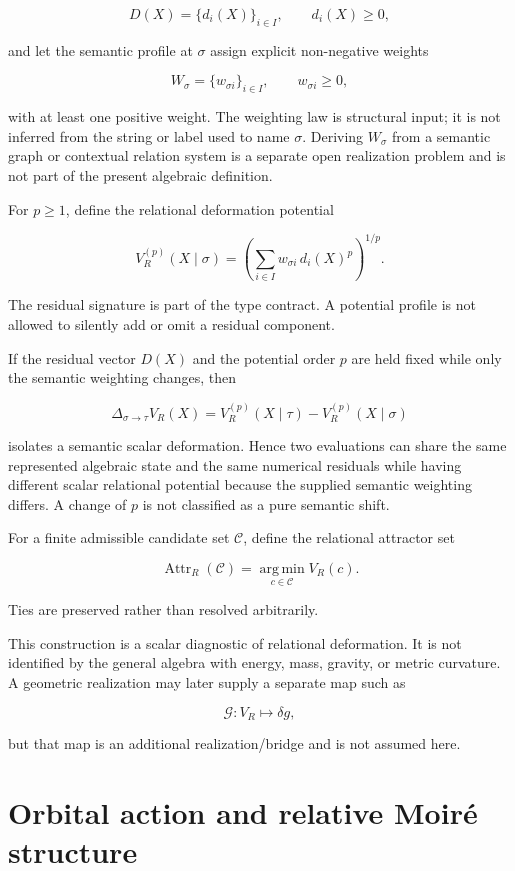 \documentclass[11pt]{article}
\begin{document}
\[
D(X)=\{d_i(X)\}_{i\in I},
\qquad
d_i(X)\ge 0,
\]

and let the semantic profile at \(\sigma\) assign explicit non-negative
weights

\[
W_\sigma=\{w_{\sigma i}\}_{i\in I},
\qquad
w_{\sigma i}\ge0,
\]

with at least one positive weight. The weighting law is structural input; it
is not inferred from the string or label used to name \(\sigma\). Deriving
\(W_\sigma\) from a semantic graph or contextual relation system is a
separate open realization problem and is not part of the present algebraic
definition.

For \(p\ge1\), define the relational deformation potential

\[
\boxed{
V_R^{(p)}(X\mid\sigma)
=
\left(
\sum_{i\in I}
w_{\sigma i}\,d_i(X)^p
\right)^{1/p}.
}
\]

The residual signature is part of the type contract. A potential profile is
not allowed to silently add or omit a residual component.

If the residual vector \(D(X)\) and the potential order \(p\) are held fixed
while only the semantic weighting changes, then

\[
\boxed{
\Delta_{\sigma\to\tau}V_R(X)
=
V_R^{(p)}(X\mid\tau)
-
V_R^{(p)}(X\mid\sigma)
}
\]

isolates a semantic scalar deformation. Hence two evaluations can share the
same represented algebraic state and the same numerical residuals while
having different scalar relational potential because the supplied semantic
weighting differs. A change of \(p\) is not classified as a pure semantic
shift.

For a finite admissible candidate set \(\mathcal C\), define the relational
attractor set

\[
\boxed{
\operatorname{Attr}_R(\mathcal C)
=
\operatorname*{arg\,min}_{c\in\mathcal C}
V_R(c).
}
\]

Ties are preserved rather than resolved arbitrarily.

This construction is a scalar diagnostic of relational deformation. It is
not identified by the general algebra with energy, mass, gravity, or metric
curvature. A geometric realization may later supply a separate map such as

\[
\mathcal G:
V_R
\longmapsto
\delta g,
\]

but that map is an additional realization/bridge and is not assumed here.

\section{Orbital action and relative Moir\'e structure}
\end{document}
